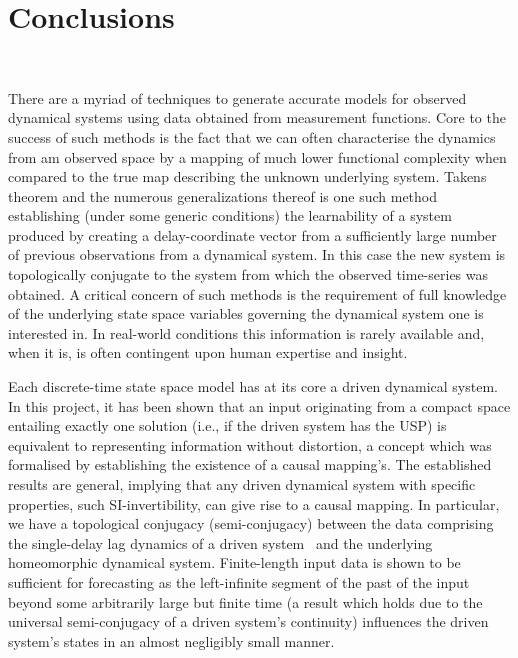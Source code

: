 \chapter{Conclusions}~\label{ch6}


There are a myriad of techniques to generate accurate models for observed dynamical systems using data obtained from measurement functions.
Core to the success of such methods is the fact that we can often characterise the dynamics from am observed space by a mapping of much lower functional complexity when compared to the true map describing the unknown underlying system. 
Takens theorem and the numerous generalizations thereof is one such method establishing (under some generic conditions) the learnability of a system produced by creating a delay-coordinate vector from a sufficiently large number of previous observations from a dynamical system. 
In this case the new system is topologically conjugate to the system from which the observed time-series was obtained.
A critical concern of such methods is the requirement of full knowledge of the underlying state space variables governing the dynamical system one is interested in. In real-world conditions this information is rarely available and, when it is, is often contingent upon human expertise and insight. 

Each discrete-time state space model has at its core a driven dynamical system. 
In this project, it has been shown that an input originating from a compact space entailing exactly one solution (i.e., if the driven system has the USP) is equivalent to representing information without distortion, a concept which was formalised by establishing the existence of a causal mapping’s. 
The established results are general, implying that any driven dynamical system with specific properties, such SI-invertibility, can give rise to a causal mapping. 
In particular, we have a topological conjugacy (semi-conjugacy) between the data comprising the single-delay lag dynamics of a driven system~\cite{manjunath2013echo} and the underlying homeomorphic dynamical system. 
Finite-length input data is shown to be sufficient for forecasting as the left-infinite segment of the past of the input beyond some arbitrarily large but finite time (a result which holds due to the universal semi-conjugacy of a driven system’s continuity) influences the driven system's states in an almost negligibly small manner.

